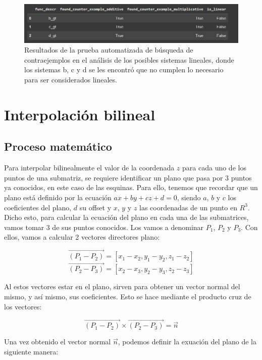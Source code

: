 \documentclass[12pt,a4paper]{article}
\begin{document}
\begin{figure}[h!]
    \centering
    \includegraphics[width=\textwidth]{../img/counterexamples.PNG}
    \caption{Resultados de la prueba automatizada de búsqueda de contraejemplos en el análisis de los posibles sistemas lineales, donde los sistemas b, c y d se les encontró que no cumplen lo necesario para ser considerados lineales.}
    \label{fig:counterexamples}
\end{figure}

\section{Interpolación bilineal}

\subsection{Proceso matemático}

Para interpolar bilinealmente el valor de la coordenada $z$ para cada uno de los puntos de una submatriz, se requiere identificar un plano que pasa por 3 puntos ya conocidos, en este caso de las esquinas. Para ello, tenemos que recordar que un plano está definido por la ecuación $ax + by + cz + d = 0$, siendo $a$, $b$ y $c$ los coeficientes del plano, $d$ su offset y $x$, $y$ y $z$ las coordenadas de un punto en $R^3$. \\

Dicho esto, para calcular la ecuación del plano en cada una de las submatrices, vamos tomar 3 de sus puntos conocidos. Los vamos a denominar $P_1$, $P_2$ y $P_3$. Con ellos, vamos a calcular 2 vectores directores plano:

\[
\vec{(P_1 - P_2)} = [x_1 - x_2, y_1 - y_2, z_1 - z_2]
\]
\[
\vec{(P_2 - P_3)} = [x_2 - x_3, y_2 - y_3, z_2 - z_3]
\]

Al estos vectores estar en el plano, sirven para obtener un vector normal del mismo, y así mismo, sus coeficientes. Esto se hace mediante el producto cruz de los vectores:

\[
\vec{(P_1 - P_2)} \times \vec{(P_2 - P_3)} = \vec{n}
\]

Una vez obtenido el vector normal $\vec{n}$, podemos definir la exuación del plano de la siguiente manera:
\end{document}
